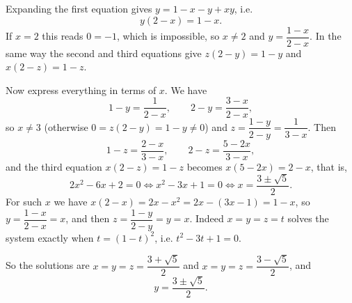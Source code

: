 Expanding the first equation gives $y=1-x-y+xy$, i.e.
\[
y(2-x)=1-x .
\]
If $x=2$ this reads $0=-1$, which is impossible, so $x\ne2$ and $y=\dfrac{1-x}{2-x}$. In the same way the second and third equations give $z(2-y)=1-y$ and $x(2-z)=1-z$.

Now express everything in terms of $x$. We have
\[
1-y=\dfrac{1}{2-x},\qquad 2-y=\dfrac{3-x}{2-x},
\]
so $x\ne3$ (otherwise $0=z(2-y)=1-y\ne0$) and $z=\dfrac{1-y}{2-y}=\dfrac{1}{3-x}$. Then
\[
1-z=\dfrac{2-x}{3-x},\qquad 2-z=\dfrac{5-2x}{3-x},
\]
and the third equation $x(2-z)=1-z$ becomes $x(5-2x)=2-x$, that is,
\[
2x^2-6x+2=0\iff x^2-3x+1=0\iff x=\dfrac{3\pm\sqrt5}{2}.
\]
For such $x$ we have $x(2-x)=2x-x^2=2x-(3x-1)=1-x$, so $y=\dfrac{1-x}{2-x}=x$, and then $z=\dfrac{1-y}{2-y}=y=x$. Indeed $x=y=z=t$ solves the system exactly when $t=(1-t)^2$, i.e. $t^2-3t+1=0$.

So the solutions are $x=y=z=\dfrac{3+\sqrt5}{2}$ and $x=y=z=\dfrac{3-\sqrt5}{2}$, and
\[
y=\boxed{\dfrac{3\pm\sqrt5}{2}} .
\]
